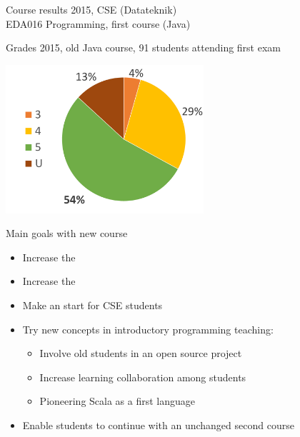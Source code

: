 \documentclass{lecturenotes}
\begin{document}
\begin{Slide}{Course results 2015, CSE (Datateknik)\\EDA016 Programming, first course (Java)}

Grades 2015, old Java course,  91 students attending first exam
\vspace{2em}

\includegraphics[width=0.55\textwidth]{img/grades-2015}


\end{Slide}

\begin{Slide}{Main goals with new course}\small
\begin{itemize}
\item Increase the  
\item Increase the 
\item Make an  start for CSE students 
\item Try new concepts in introductory programming teaching:
\begin{itemize}
\item Involve old students in an open source project
\item Increase learning collaboration among students
\item Pioneering Scala as a first language
\end{itemize}
\item Enable students to continue with an unchanged second course
\end{itemize}
\end{Slide}
\end{document}
